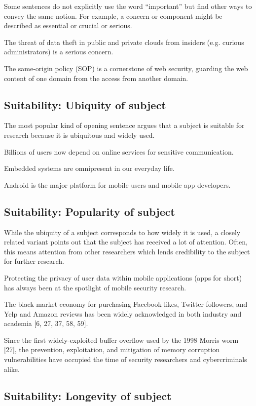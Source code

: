 \documentclass[sigconf]{acmart}
\begin{document}
	Some sentences do not explicitly use the word “important” but find other ways to convey the same notion. For example, a concern or component might be described as essential or crucial or serious.
	
	The threat of data theft in public and private clouds from insiders (e.g. curious administrators) is a serious concern.
	
	The same-origin policy (SOP) is a cornerstone of web security, guarding the web content of one domain from the access from another domain.
	
\subsection{Suitability: Ubiquity of subject}
	
	The most popular kind of opening sentence argues that a subject is suitable for research because it is ubiquitous and widely used.
	
	Billions of users now depend on online services for sensitive communication.
	
	Embedded systems are omnipresent in our everyday life.
	
	Android is the major platform for mobile users and mobile app developers.
	
\subsection{Suitability: Popularity of subject}
	
	While the ubiquity of a subject corresponds to how widely it is used, a closely related variant points out that the subject has received a lot of attention. Often, this means attention from other researchers which lends credibility to the subject for further research.
	
	Protecting the privacy of user data within mobile applications (apps for short) has always been at the spotlight of mobile security research.
	
	The black-market economy for purchasing Facebook likes, Twitter followers, and Yelp and Amazon reviews has been widely acknowledged in both industry and academia [6, 27, 37, 58, 59].
	
	Since the first widely-exploited buffer overflow used by the 1998 Morris worm [27], the prevention, exploitation, and mitigation of memory corruption vulnerabilities have occupied the time of security researchers and cybercriminals alike.
	
\subsection{Suitability: Longevity of subject }
	
\end{document}

